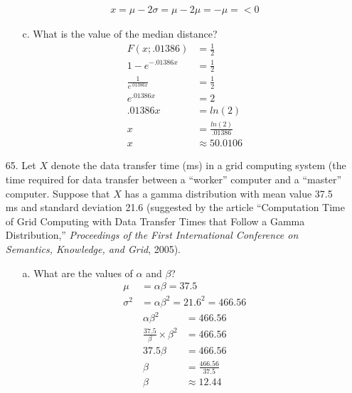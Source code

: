 \documentclass[letterpaper,12pt]{article}
\begin{document}
\begin{enumerate}
\begin{enumerate}
        \begin{align*}
          x = \mu - 2\sigma = \mu - 2\mu = -\mu = < 0
        \end{align*}
      \item[c.]
        What is the value of the median distance?
        \begin{align*}
          F(x; .01386) &= \frac{1}{2} \\
          1 - e^{-.01386x} &= \frac{1}{2} \\
          \frac{1}{e^{.01386x}} &= \frac{1}{2} \\
          e^{.01386x} &= 2 \\
          .01386x &= ln(2) \\
          x &= \frac{ln(2)}{.01386} \\
          x &\approx 50.0106
        \end{align*}
    \end{enumerate}
  \item[65.]
    Let $X$ denote the data transfer time (ms) in a grid computing system (the time required for data transfer between a ``worker'' computer and a ``master'' computer. Suppose that $X$ has a gamma distribution with mean value 37.5 ms and standard deviation 21.6 (suggested by the article ``Computation Time of Grid Computing with Data Transfer Times that Follow a Gamma Distribution,'' \textit{Proceedings of the First International Conference on Semantics, Knowledge, and Grid}, 2005).
    \begin{enumerate}
      \item[a.]
        What are the values of $\alpha$ and $\beta$?
        \begin{align*}
          \mu &= \alpha\beta = 37.5 \\
          \sigma^2 &= \alpha\beta^2 = 21.6^2 = 466.56
        \end{align*}
        \begin{align*}
          \alpha\beta^2 &= 466.56 \\
          \frac{37.5}{\beta} \times \beta^2 &= 466.56 \\
          37.5\beta &= 466.56 \\
          \beta &= \frac{466.56}{37.5} \\
          \beta &\approx 12.44

\end{align*}
\end{enumerate}
\end{enumerate}
\end{document}
